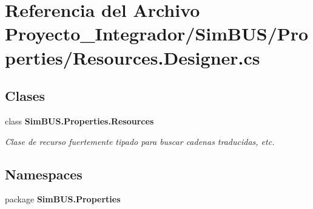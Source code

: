\section{Referencia del Archivo Proyecto\-\_\-\-Integrador/\-Sim\-B\-U\-S/\-Properties/\-Resources.Designer.\-cs}
\label{_sim_b_u_s_2_properties_2_resources_8_designer_8cs}
\subsection*{Clases}
\begin{DoxyCompactItemize}
\item 
class {\bf Sim\-B\-U\-S.\-Properties.\-Resources}
\begin{DoxyCompactList}\small\item\em Clase de recurso fuertemente tipado para buscar cadenas traducidas, etc. \end{DoxyCompactList}\end{DoxyCompactItemize}
\subsection*{Namespaces}
\begin{DoxyCompactItemize}
\item 
package {\bf Sim\-B\-U\-S.\-Properties}
\end{DoxyCompactItemize}
